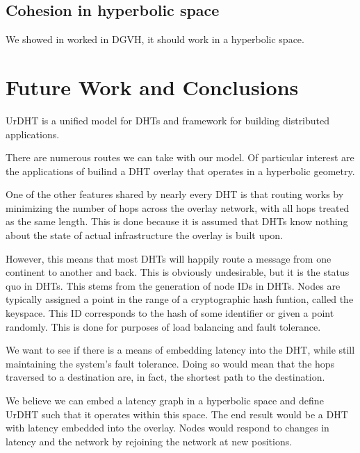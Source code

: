 \documentclass[11pt,conference]{IEEEtran}
\begin{document}
\subsection{Cohesion in hyperbolic space}
We showed in worked in DGVH, it should work in a hyperbolic space.






\section{Future Work and Conclusions}
\label{sec:future}

UrDHT is a unified model for DHTs and framework for building distributed applications.



There are numerous routes we can take with our model.
Of particular interest are the applications of builind a DHT overlay that operates in a hyperbolic geometry.

One of the other features shared by nearly every DHT is that routing works by minimizing the number of hops across the overlay network, with all hops treated as the same length.
This is done because it is assumed that DHTs know nothing about the state of actual infrastructure the overlay is built upon.

However, this means that most DHTs will happily route a message from one continent to another and back.
This is obviously undesirable, but it is the status quo in DHTs.
This stems from the generation of node IDs in DHTs. 
Nodes are typically assigned a point in the range of a cryptographic hash funtion, called the keyspace. 
This ID corresponds to the hash of some identifier or given a point randomly.
This is done for purposes of load balancing and fault tolerance.

We want to see if there is a means of embedding latency into the DHT, while still maintaining the system's fault tolerance.
Doing so would mean that the hops traversed to a destination are, in fact, the shortest path to the destination.

We believe we can embed a latency graph in a hyperbolic space and define UrDHT such that it operates within this space.
The end result would be a DHT with latency embedded into the overlay.
Nodes would respond to changes in latency and the network by rejoining the network at new positions.






\end{document}
